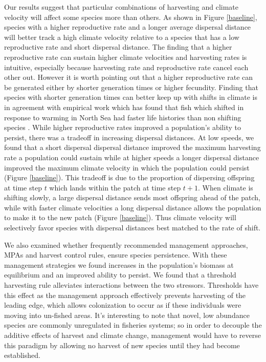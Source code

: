 \documentclass[12pt,english]{article}
\begin{document}
\begin{spacing}{1.9}
\begin{flushleft}
Our results suggest that particular combinations of harvesting and climate velocity will affect some species more than others. As shown in Figure \ref{baseline}, species with a higher reproductive rate and a longer average dispersal distance will better track a high climate velocity relative to a species that has a low reproductive rate and short dispersal distance. The finding that a higher reproductive rate can sustain higher climate velocities and harvesting rates is intuitive, especially because harvesting rate and reproductive rate cancel each other out. However it is worth pointing out that a higher reproductive rate can be generated either by shorter generation times or higher fecundity. Finding that species with shorter generation times can better keep up with shifts in climate is in agreement with empirical work which has found that fish which shifted in response to warming in North Sea had faster life histories than non shifting species \citep{Perryetal2005}. While higher reproductive rates improved a population's ability to persist, there was a tradeoff in increasing dispersal distances. At low speeds, we found that a short dispersal dispersal distance improved the maximum harvesting rate a population could sustain while at higher speeds a longer dispersal distance improved the maximum climate velocity in which the population could persist (Figure \ref{baseline}). This tradeoff is due to the proportion of dispersing  offspring at time step $t$ which lands within the patch at time step $t + 1$. When climate is shifting slowly, a large dispersal distance sends most offspring ahead of the patch, while with faster climate velocities a long dispersal distance allows the population to make it to the new patch (Figure \ref{baseline}). Thus climate velocity will selectively favor species with dispersal distances best matched to the rate of shift.   

We also examined whether frequently recommended management approaches, MPAs and harvest control rules, ensure species persistence. With these management strategies we found increases in the population's biomass at equilibrium and an improved ability to persist.  We found that a threshold harvesting rule alleviates interactions between the two stressors. Thresholds have this effect as the management approach effectively prevents harvesting of the leading edge, which allows colonization to occur as if these individuals were moving into un-fished areas. It's interesting to note that novel, low abundance species are commonly unregulated in fisheries systems; so in order to decouple the additive effects of harvest and climate change, management would have to reverse this paradigm by allowing no harvest of new species until they had become established.  


\end{flushleft}
\end{spacing}
\end{document}
